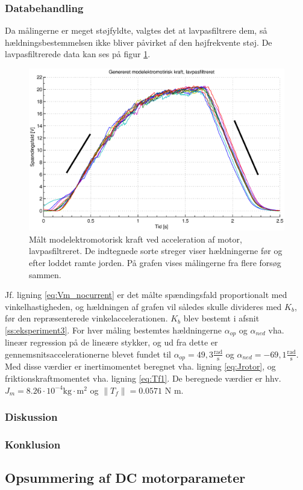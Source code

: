 \subsubsection{Databehandling}
Da målingerne er meget støjfyldte, valgtes det at lavpasfiltrere dem, så hældningsbestemmelsen
ikke bliver påvirket af den højfrekvente støj.
De lavpasfiltrerede data kan ses på figur \ref{fig:vemf1}.
\begin{figure}[th!]
	\centering
	\includegraphics[width=1\textwidth]{./graphics/vemf1.eps}
	\caption[Målt modelektromotorisk kraft ved acceleration af motor, lavpasfiltreret]
		{Målt modelektromotorisk kraft ved acceleration af motor, lavpasfiltreret.
		De indtegnede sorte streger viser hældningerne før og efter loddet ramte jorden.
		På grafen vises målingerne fra flere forsøg sammen.}
	\label{fig:vemf1}
\end{figure}
Jf. ligning \ref{eq:Vm_nocurrent} er det målte spændingsfald proportionalt med
vinkelhastigheden, og hældningen af grafen vil således skulle divideres med $K_b$,
før den repræsenterede vinkelaccelerationen. $K_b$ blev bestemt i afsnit \ref{ss:eksperiment3}.
For hver måling bestemtes hældningerne $\alpha_{op}$ og $\alpha_{ned}$ vha. lineær regression på de lineære stykker,
og ud fra dette er gennemsnitsaccelerationerne blevet fundet til
$\alpha_{op}=49,3 \frac{\text{rad}}{\text{s}}$ og $\alpha_{ned}=-69,1 \frac{\text{rad}}{\text{s}}$.
Med disse værdier er inertimomentet beregnet vha. ligning \ref{eq:Jrotor}, og friktionskraftmomentet vha. ligning \ref{eq:Tf1}.
De beregnede værdier er hhv. $J_m=8.26\cdot10^{-4} \text{kg}\cdot{\text{m}^2}$ og $\|T_f\|=0.0571$ N m.
\subsubsection{Diskussion}
\subsubsection{Konklusion}

\subsection{Opsummering af DC motorparameter}
